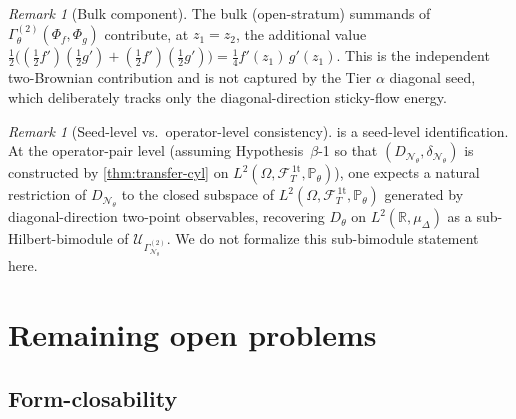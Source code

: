 \documentclass[11pt,reqno]{amsart}
\theoremstyle{plain}
\theoremstyle{definition}
\theoremstyle{remark}
\newtheorem{remark}[theorem]{Remark}
\newcommand{\R}{\mathbb R}
\newcommand{\Prob}{\mathbb P}
\newcommand{\cF}{\mathcal F}
\newcommand{\cN}{\mathcal N}
\newcommand{\cU}{\mathcal U}
\newcommand{\FT}{\cF_{T}^{\,\mathrm{1t}}}
\newcommand{\Hone}{L^{2}(\Omega,\FT,\Pth)}
\newcommand{\GamN}{\Gamma^{(2)}_{\cN_{\theta}}}
\newcommand{\GamM}[1]{\Gamma^{(#1)}_{\theta}}
\newcommand{\DN}{D_{\cN_{\theta}}}
\newcommand{\divN}{\delta_{\cN_{\theta}}}
\newcommand{\Dth}{D_{\theta}}
\newcommand{\Pth}{\Prob_{\theta}}
\begin{document}
\begin{remark}[Bulk component]\label{rem:bulk-component}
The bulk (open-stratum) summands of $\GamM{2}(\Phi_{f},\Phi_{g})$
contribute, at $z_{1}=z_{2}$, the additional value
$\tfrac12\bigl((\tfrac12 f')(\tfrac12 g')+(\tfrac12 f')(\tfrac12 g')\bigr)
=\tfrac14 f'(z_{1})\,g'(z_{1})$. This is the independent two-Brownian
contribution and is not captured by the Tier $\alpha$ diagonal seed,
which deliberately tracks only the diagonal-direction
sticky-flow energy.
\end{remark}

\begin{remark}[Seed-level vs.\ operator-level consistency]\label{rem:tier-alpha-bimodule}
 is a seed-level identification. At the
operator-pair level (assuming Hypothesis~$\beta$-1 so that
$(\DN,\divN)$ is constructed by \cref{thm:transfer-cyl} on
$\Hone$), one expects a natural restriction of $\DN$ to the closed
subspace of $\Hone$ generated by diagonal-direction two-point
observables, recovering $\Dth$ on $L^{2}(\R,\mu_{\Delta})$ as a
sub-Hilbert-bimodule of $\cU_{\GamN}$. We do not formalize this
sub-bimodule statement here.
\end{remark}

\section{Remaining open problems}\label{sec:open}

\subsection{Form-closability}\label{sec:open-formclos}
\end{document}
